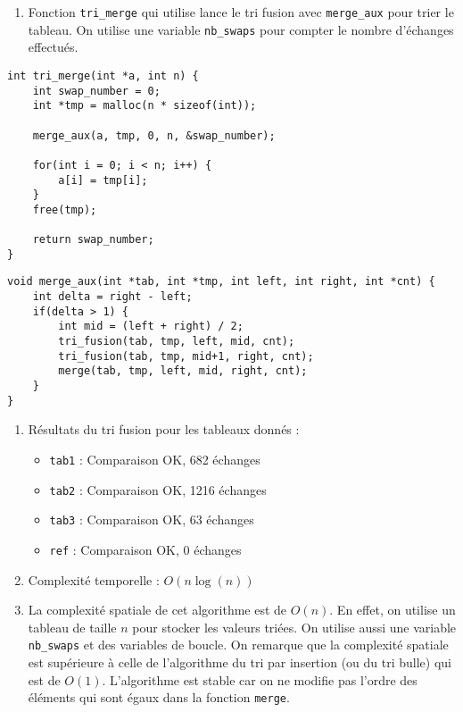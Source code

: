 \documentclass[12pt]{article}
\begin{document}
\begin{enumerate}[resume]
    \item Fonction \texttt{tri\_merge} qui utilise lance le tri fusion avec \texttt{merge\_aux} pour trier le tableau. On utilise une variable \texttt{nb\_swaps} pour compter le nombre d'échanges effectués.
\end{enumerate}

\begin{lstlisting}[style=languageClarge, caption=Implémentation de la fonction \texttt{tri\_merge}]
int tri_merge(int *a, int n) {
    int swap_number = 0;
    int *tmp = malloc(n * sizeof(int));

    merge_aux(a, tmp, 0, n, &swap_number);
    
    for(int i = 0; i < n; i++) {
        a[i] = tmp[i];
    }
    free(tmp);

    return swap_number;
}
\end{lstlisting}

\begin{lstlisting}[style=languageClarge, caption=Implémentation de la fonction \texttt{merge\_aux}]
void merge_aux(int *tab, int *tmp, int left, int right, int *cnt) {
    int delta = right - left;
    if(delta > 1) {
        int mid = (left + right) / 2;
        tri_fusion(tab, tmp, left, mid, cnt);
        tri_fusion(tab, tmp, mid+1, right, cnt);
        merge(tab, tmp, left, mid, right, cnt);
    }
}
\end{lstlisting}

\begin{enumerate}[resume]
    \item Résultats du tri fusion pour les tableaux donnés :
    \begin{itemize}
        \item \texttt{tab1} : Comparaison OK, 682 échanges
        \item \texttt{tab2} : Comparaison OK, 1216 échanges
        \item \texttt{tab3} : Comparaison OK, 63 échanges
        \item \texttt{ref} : Comparaison OK, 0 échanges
    \end{itemize}
    \item Complexité temporelle : $O(n\log(n))$
    \item La complexité spatiale de cet algorithme est de $O(n)$. En effet, on utilise un tableau de taille $n$ pour stocker les valeurs triées. On utilise aussi une variable \texttt{nb\_swaps} et des variables de boucle. On remarque que la complexité spatiale est supérieure à celle de l'algorithme du tri par insertion (ou du tri bulle) qui est de $O(1)$. L'algorithme est stable car on ne modifie pas l'ordre des éléments qui sont égaux dans la fonction \texttt{merge}.
\end{enumerate}
\end{document}

